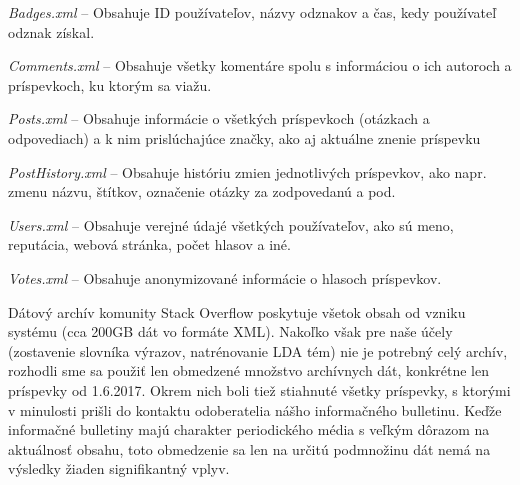 \begin{my_itemize}
  \item{\textit{Badges.xml} -- Obsahuje ID používateľov, názvy odznakov a čas, kedy používateľ odznak získal.}
  \item{\textit{Comments.xml} -- Obsahuje všetky komentáre spolu s informáciou o ich autoroch a príspevkoch, ku ktorým sa viažu.}
  \item{\textit{Posts.xml} -- Obsahuje informácie o všetkých príspevkoch (otázkach a odpovediach) a k nim prislúchajúce značky, ako aj aktuálne znenie príspevku}
  \item{\textit{PostHistory.xml} -- Obsahuje históriu zmien jednotlivých príspevkov, ako napr. zmenu názvu, štítkov, označenie otázky za zodpovedanú a pod.}
  \item{\textit{Users.xml} -- Obsahuje verejné údajé všetkých používateľov, ako sú meno, reputácia, webová stránka, počet hlasov a iné.}
  \item{\textit{Votes.xml} -- Obsahuje anonymizované informácie o hlasoch príspevkov.}
\end{my_itemize}

Dátový archív komunity Stack Overflow poskytuje všetok obsah od vzniku systému (cca 200GB dát vo formáte XML). Nakoľko
však pre naše účely (zostavenie slovníka výrazov, natrénovanie LDA tém) nie je potrebný celý archív,
rozhodli sme sa použiť len obmedzené množstvo archívnych dát, konkrétne len príspevky od 1.6.2017.
Okrem nich boli tiež stiahnuté všetky príspevky, s ktorými v minulosti prišli do kontaktu odoberatelia nášho informačného
bulletinu. Keďže informačné bulletiny majú charakter periodického média s veľkým dôrazom na aktuálnosť obsahu, toto
obmedzenie sa len na určitú podmnožinu dát nemá na výsledky žiaden signifikantný vplyv.
